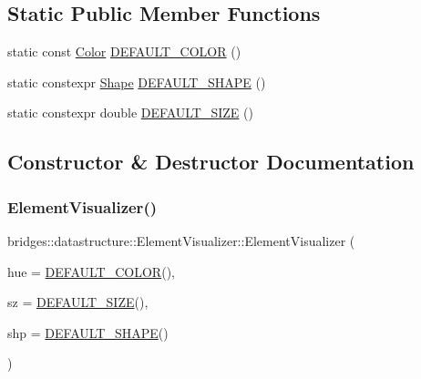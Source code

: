 \subsection*{Static Public Member Functions}
\begin{DoxyCompactItemize}
\item 
static const \hyperlink{classbridges_1_1datastructure_1_1_color}{Color} \hyperlink{classbridges_1_1datastructure_1_1_element_visualizer_a777a0295e8216e403108a6c90ce6790b}{D\+E\+F\+A\+U\+L\+T\+\_\+\+C\+O\+L\+OR} ()
\item 
static constexpr \hyperlink{namespacebridges_1_1datastructure_a3408f5f44d9c6062e5f3adb7e1bbb7f0}{Shape} \hyperlink{classbridges_1_1datastructure_1_1_element_visualizer_adfba1c4d4f04ff92545d932bfce5b9d1}{D\+E\+F\+A\+U\+L\+T\+\_\+\+S\+H\+A\+PE} ()
\item 
static constexpr double \hyperlink{classbridges_1_1datastructure_1_1_element_visualizer_afa0fa3f844171f311c3d9c9025a826c5}{D\+E\+F\+A\+U\+L\+T\+\_\+\+S\+I\+ZE} ()
\end{DoxyCompactItemize}


\subsection{Constructor \& Destructor Documentation}
\mbox{\label{classbridges_1_1datastructure_1_1_element_visualizer_a8104e42b94927a9b45a237064d75ca33}} 
\subsubsection{\texorpdfstring{Element\+Visualizer()}{ElementVisualizer()}}
{\footnotesize\ttfamily bridges\+::datastructure\+::\+Element\+Visualizer\+::\+Element\+Visualizer (\begin{DoxyParamCaption}\item[{const \hyperlink{classbridges_1_1datastructure_1_1_color}{Color} \&}]{hue = {\ttfamily \hyperlink{classbridges_1_1datastructure_1_1_element_visualizer_a777a0295e8216e403108a6c90ce6790b}{D\+E\+F\+A\+U\+L\+T\+\_\+\+C\+O\+L\+OR}()},  }\item[{const double \&}]{sz = {\ttfamily \hyperlink{classbridges_1_1datastructure_1_1_element_visualizer_afa0fa3f844171f311c3d9c9025a826c5}{D\+E\+F\+A\+U\+L\+T\+\_\+\+S\+I\+ZE}()},  }\item[{const \hyperlink{namespacebridges_1_1datastructure_a3408f5f44d9c6062e5f3adb7e1bbb7f0}{Shape} \&}]{shp = {\ttfamily \hyperlink{classbridges_1_1datastructure_1_1_element_visualizer_adfba1c4d4f04ff92545d932bfce5b9d1}{D\+E\+F\+A\+U\+L\+T\+\_\+\+S\+H\+A\+PE}()} }\end{DoxyParamCaption})\hspace{0.3cm}{\ttfamily [inline]}}

